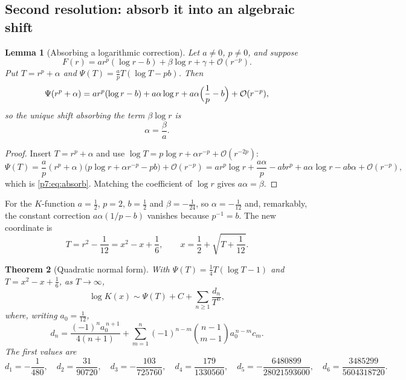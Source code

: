 \documentclass[11pt,a4paper,oneside]{book}
\theoremstyle{plain}
\newtheorem{theorem}{Theorem}[chapter]
\newtheorem{lemma}[theorem]{Lemma}
\theoremstyle{definition}
\theoremstyle{remark}
\newcommand{\bigO}{\mathcal{O}}
\begin{document}
\subsection{Second resolution: absorb it into an algebraic shift}

\begin{lemma}[Absorbing a logarithmic correction]\label{p7:lem:absorb}
Let $a\ne0$, $p\ne0$, and suppose
\begin{equation}\label{p7:eq:absorb-hyp}
 F(r)=a r^{p}(\log r-b)+\beta\log r+\gamma+\bigO(r^{-p}).
\end{equation}
Put $T=r^{p}+\alpha$ and $\Psi(T)=\tfrac ap T(\log T-pb)$.  Then
\begin{equation}\label{p7:eq:absorb}
 \Psi(r^{p}+\alpha)
 =a r^{p}(\log r-b)+a\alpha\log r
 +a\alpha\Bigl(\frac1p-b\Bigr)+\bigO(r^{-p}),
\end{equation}
so the unique shift absorbing the term $\beta\log r$ is
\begin{equation}\label{p7:eq:alpha}
 \alpha=\frac\beta a .
\end{equation}
\end{lemma}

\begin{proof}
Insert $T=r^{p}+\alpha$ and use
$\log T=p\log r+\alpha r^{-p}+\bigO(r^{-2p})$:
\[
 \Psi(T)=\frac ap(r^{p}+\alpha)\bigl(p\log r+\alpha r^{-p}-pb\bigr)
 +\bigO(r^{-p})
 =a r^{p}\log r+\frac{a\alpha}p-abr^{p}+a\alpha\log r-ab\alpha+\bigO(r^{-p}),
\]
which is \eqref{p7:eq:absorb}.  Matching the coefficient of $\log r$ gives
$a\alpha=\beta$.
\end{proof}

For the $K$-function $a=\tfrac12$, $p=2$, $b=\tfrac12$ and
$\beta=-\tfrac1{24}$, so $\alpha=-\tfrac1{12}$ and, remarkably, the constant
correction $a\alpha(1/p-b)$ vanishes because $p^{-1}=b$.  The new coordinate is
\begin{equation}\label{p7:eq:T-coordinate}
 T=r^{2}-\frac1{12}=x^{2}-x+\frac16,
 \qquad
 x=\frac12+\sqrt{T+\frac1{12}} .
\end{equation}

\begin{theorem}[Quadratic normal form]\label{p7:thm:T-normal-form}
With $\Psi(T)=\tfrac14T(\log T-1)$ and $T=x^{2}-x+\tfrac16$, as
$T\to\infty$,
\begin{equation}\label{p7:eq:T-normal}
 \log K(x)\sim\Psi(T)+C+\sum_{n\ge1}\frac{d_n}{T^{n}},
\end{equation}
where, writing $a_0=\tfrac1{12}$,
\begin{equation}\label{p7:eq:dn}
 d_n=\frac{(-1)^{n}a_0^{\,n+1}}{4(n+1)}
 +\sum_{m=1}^{n}(-1)^{n-m}\binom{n-1}{m-1}a_0^{\,n-m}c_m .
\end{equation}
The first values are
\begin{equation}\label{p7:eq:dn-values}
 d_1=-\frac1{480},\quad
 d_2=\frac{31}{90720},\quad
 d_3=-\frac{103}{725760},\quad
 d_4=\frac{179}{1330560},\quad
 d_5=-\frac{6480899}{28021593600},\quad
 d_6=\frac{3485299}{5604318720}.
\end{equation}
\end{theorem}
\end{document}
